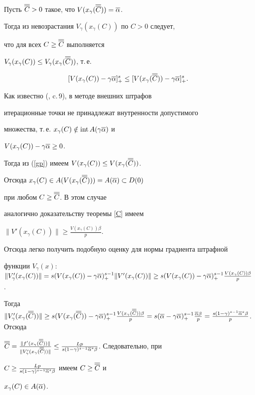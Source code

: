 \begin{pf}


Пусть $\overline {\overline C}>0$ такое, что $V(x_\gamma(\overline{\overline C}))=\overline\alpha$. 


Тогда из невозрастания $V_\gamma(x_\gamma(C))$ по $C>0$ следует,


что для всех $C\geq\overline{\overline C}$ выполняется


$V_\gamma(x_\gamma(C))\leq V_\gamma(x_\gamma(\overline{\overline C}))$, т.\,е.


\begin{equation}\label{gp}


[V(x_\gamma(C))-\gamma \o\alpha]_+^s\leq


[V(x_\gamma(\o{\o C}))-\gamma \o\alpha]_+^s.


\end{equation}


Как известно (\cite{Fiacco}, c.\,9), в методе внешних штрафов 


итерационные точки не принадлежат внутренности допустимого


множества, т.\,е. $x_\gamma(C)\notin \operatorname{int} A(\gamma \overline\alpha)$ и 


$V(x_\gamma(C))-\gamma \overline\alpha\geq 0$.


Тогда из (\ref{gp}) имеем $V(x_\gamma(C))\leq V(x_\gamma(\overline {\overline C}))$.


Отсюда $x_\gamma(C)\in A(V(x_\gamma(\overline {\overline C})))=A(\overline\alpha)\subset D(0)$ 


при любом $C\geq \overline{\overline C}$. В этом случае


аналогично доказательству теоремы \ref{C} имеем


$\|V'(x_\gamma (C))\| \geq\frac{V(x_\gamma (C))\beta}{p}$. 


Отсюда легко получить подобную оценку для нормы градиента штрафной 


функции $V_\gamma(x)$: $\|V'_\gamma(x_\gamma(C))\| =


s(V(x_\gamma(C))-\gamma \o\alpha)_+^{s-1}\|V'(x_\gamma(C))\| \geq


s(V(x_\gamma(C))-\gamma \o\alpha)_+^{s-1}\frac{V(x_\gamma(C))\beta}{p}$.


Тогда $\|V'_\gamma(x_\gamma(\o{\o C}))\|\geq s(V(x_\gamma(\o{\o C}))-


\gamma \o\alpha)_+^{s-1}\frac{V(x_\gamma(\o{\o C}))\beta}{p}=


s(\o\alpha-\gamma \o\alpha)_+^{s-1}\frac{\o\alpha\beta}{p}=


\frac{s(1-\gamma)^{s-1}\o\alpha^s\beta}{p}$. Отсюда


$\o {\o C}=\frac{\|f'(x_\gamma(\o{\o C}))\|}


{\|V'_\gamma(x_\gamma(\o {\o C}))\|}\leq


\frac{Lp}{s(1-\gamma)^{s-1}\o\alpha^s\beta}$. Следовательно, при


$C\geq\frac{Lp}{s(1-\gamma)^{s-1}\overline\alpha^s\beta}$ имеем $C\geq\overline{\overline C}$ и


$x_\gamma(C)\in A(\overline\alpha)$.


\end{pf}






